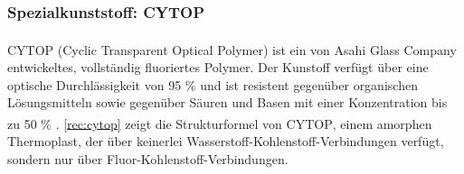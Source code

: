 \subsubsection{Spezialkunststoff: CYTOP\textsuperscript{\texttrademark}}
\label{subsec:pofcytop}

CYTOP\textsuperscript{\texttrademark} (Cyclic Transparent Optical Polymer) ist
ein von Asahi Glass Company entwickeltes, vollständig fluoriertes Polymer. Der
Kunstoff verfügt über eine optische Durchlässigkeit von 95 \% und ist resistent
gegenüber organischen Lösungsmitteln sowie gegenüber Säuren und Basen mit einer
Konzentration bis zu 50 \% \cite{pofagc}. \autoref{rec:cytop} zeigt die
Strukturformel von CYTOP\textsuperscript{\texttrademark}, einem amorphen
Thermoplast, der über keinerlei Wasserstoff-Kohlenstoff-Verbindungen verfügt,
sondern nur über Fluor-Kohlenstoff-Verbindungen.

